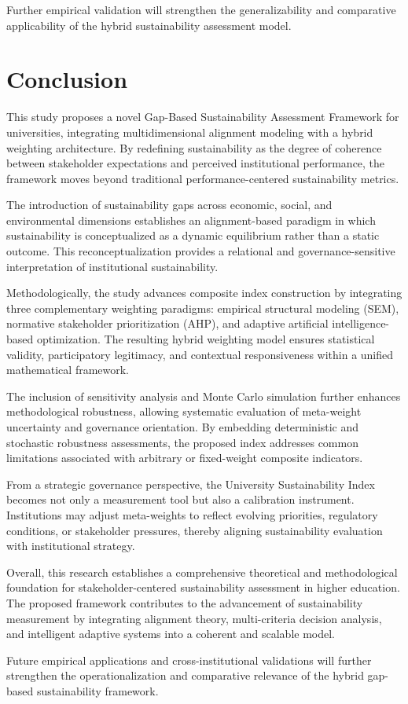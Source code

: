 \documentclass[11pt,a4paper]{article}
\begin{document}
Further empirical validation will strengthen the generalizability and 
comparative applicability of the hybrid sustainability assessment model.

\section{Conclusion}

This study proposes a novel Gap-Based Sustainability Assessment Framework 
for universities, integrating multidimensional alignment modeling with 
a hybrid weighting architecture. By redefining sustainability as the 
degree of coherence between stakeholder expectations and perceived 
institutional performance, the framework moves beyond traditional 
performance-centered sustainability metrics.

The introduction of sustainability gaps across economic, social, and 
environmental dimensions establishes an alignment-based paradigm in 
which sustainability is conceptualized as a dynamic equilibrium rather 
than a static outcome. This reconceptualization provides a relational 
and governance-sensitive interpretation of institutional sustainability.

Methodologically, the study advances composite index construction by 
integrating three complementary weighting paradigms: empirical 
structural modeling (SEM), normative stakeholder prioritization (AHP), 
and adaptive artificial intelligence-based optimization. The resulting 
hybrid weighting model ensures statistical validity, participatory 
legitimacy, and contextual responsiveness within a unified mathematical 
framework.

The inclusion of sensitivity analysis and Monte Carlo simulation further 
enhances methodological robustness, allowing systematic evaluation of 
meta-weight uncertainty and governance orientation. By embedding 
deterministic and stochastic robustness assessments, the proposed index 
addresses common limitations associated with arbitrary or fixed-weight 
composite indicators.

From a strategic governance perspective, the University Sustainability 
Index becomes not only a measurement tool but also a calibration 
instrument. Institutions may adjust meta-weights to reflect evolving 
priorities, regulatory conditions, or stakeholder pressures, thereby 
aligning sustainability evaluation with institutional strategy.

Overall, this research establishes a comprehensive theoretical and 
methodological foundation for stakeholder-centered sustainability 
assessment in higher education. The proposed framework contributes to 
the advancement of sustainability measurement by integrating alignment 
theory, multi-criteria decision analysis, and intelligent adaptive 
systems into a coherent and scalable model.

Future empirical applications and cross-institutional validations will 
further strengthen the operationalization and comparative relevance of 
the hybrid gap-based sustainability framework.



\end{document}
